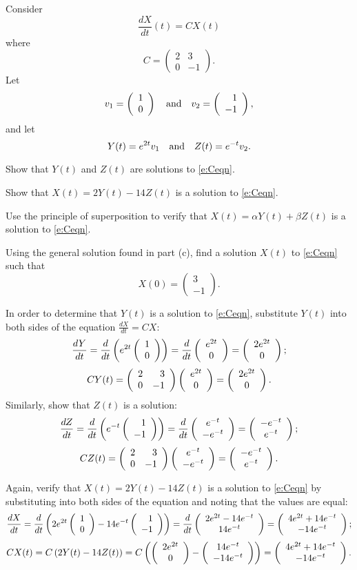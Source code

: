 \documentclass{ximera}
\begin{document}
\begin{exercise} \label{c4.5.1}
Consider
\begin{equation}  \label{e:Ceqn}
\frac{dX}{dt}(t) = CX(t)
\end{equation}
where
\[
C=\left(\begin{array}{cr} 2 & 3\\0& -1 \end{array}\right).
\]
Let
\[
v_1=\left(\begin{array}{c} 1\\0\end{array}\right)\quad\mbox{and}\quad
v_2=\left(\begin{array}{r} 1\\-1\end{array}\right),
\]
and let
\[
Y(t)=e^{2t} v_1 \quad\mbox{and}\quad Z(t)=e^{-t}v_2.
\]
\begin{enumeratea}
\item Show that $Y(t)$ and $Z(t)$ are solutions to \eqref{e:Ceqn}.
\item Show that $X(t)=2Y(t)-14Z(t)$ is a solution to \eqref{e:Ceqn}.
\item Use the principle of superposition to verify that
$X(t)=\alpha Y(t) + \beta Z(t)$ is a solution to \eqref{e:Ceqn}.
\item Using the general solution found in part (c), find a solution
$X(t)$ to \eqref{e:Ceqn} such that
\[
X(0) = \left(\begin{array}{r} 3\\-1\end{array}\right).
\]
\end{enumeratea}

\begin{solution}
\soln
\begin{enumeratea}
\item In order to determine that $Y(t)$ is a solution
to \eqref{e:Ceqn}, substitute $Y(t)$ into both sides of the 
equation $\frac{dX}{dt} = CX$:
\[
\frac{dY}{dt}
= \frac{d}{dt}\left(e^{2t}\left(\begin{array}{r} 1 \\ 0\end{array}\right)\right)
= \frac{d}{dt}\left(\begin{array}{c} e^{2t} \\ 0\end{array}\right)
= \left(\begin{array}{c} 2e^{2t} \\ 0\end{array}\right);
\]
\[
CY(t)
= \left(\begin{array}{rr} 2 & 3\\ 0 &-1\end{array}\right)\left(\begin{array}{c} e^{2t} \\ 0\end{array}\right)
= \left(\begin{array}{c} 2e^{2t} \\ 0\end{array}\right).
\]
Similarly, show that $Z(t)$ is a solution:
\[
\frac{dZ}{dt}
= \frac{d}{dt}\left(e^{-t}\left(\begin{array}{r} 1 \\ -1\end{array}\right)\right)
= \frac{d}{dt}\left(\begin{array}{c} e^{-t} \\ -e^{-t}\end{array}\right)
= \left(\begin{array}{c} -e^{-t} \\ e^{-t}\end{array}\right);
\]
\[
CZ(t)
= \left(\begin{array}{rr} 2 & 3\\ 0 &-1\end{array}\right)\left(\begin{array}{c} e^{-t} \\ -e^{-t}\end{array}\right)
= \left(\begin{array}{c} -e^{-t} \\ e^{-t}\end{array}\right).
\]

\item Again, verify that $X(t) = 2Y(t) - 14Z(t)$ is a solution to
\eqref{e:Ceqn} by substituting into both sides of the equation and
noting that the values are equal:
\[
\frac{dX}{dt}
= \frac{d}{dt}\left(2e^{2t}\left(\begin{array}{r} 1 \\ 0\end{array}\right) - 14e^{-t}\left(\begin{array}{r} 1 \\ -1\end{array}\right)\right)
= \frac{d}{dt}\left(\begin{array}{c} 2e^{2t} - 14e^{-t} \\ 14e^{-t}\end{array}\right) 
= \left(\begin{array}{c} 4e^{2t} + 14e^{-t} \\ -14e^{-t}\end{array}\right);
\]
\[
CX(t) = C\left(2Y(t) - 14Z(t)\right)
= C\left(\left(\begin{array}{c} 2e^{2t} \\ 0\end{array}\right) - \left(\begin{array}{c} 14e^{-t} \\ -14e^{-t}\end{array}\right)\right)
= \left(\begin{array}{c} 4e^{2t} + 14e^{-t} \\ -14e^{-t}\end{array}\right).
\]


\end{enumeratea}
\end{solution}
\end{exercise}
\end{document}
